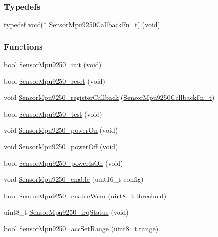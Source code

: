 \subsubsection*{Typedefs}
\begin{DoxyCompactItemize}
\item 
typedef void($\ast$ \hyperlink{_sensor_mpu9250_8h_a46597d1d93c12c2bb2bf0e7fadcf5d3c}{Sensor\+Mpu9250\+Callback\+Fn\+\_\+t}) (void)
\end{DoxyCompactItemize}
\subsubsection*{Functions}
\begin{DoxyCompactItemize}
\item 
bool \hyperlink{_sensor_mpu9250_8h_a70c3dc5a3748b4d87e627a57e00f0212}{Sensor\+Mpu9250\+\_\+init} (void)
\item 
bool \hyperlink{_sensor_mpu9250_8h_aa199e74fac83bfcc797045ce022843d6}{Sensor\+Mpu9250\+\_\+reset} (void)
\item 
void \hyperlink{_sensor_mpu9250_8h_a218bba45842f2a71ce19694c0f73518c}{Sensor\+Mpu9250\+\_\+register\+Callback} (\hyperlink{_sensor_mpu9250_8h_a46597d1d93c12c2bb2bf0e7fadcf5d3c}{Sensor\+Mpu9250\+Callback\+Fn\+\_\+t})
\item 
bool \hyperlink{_sensor_mpu9250_8h_a46bb976672f9a571ff18566d1d3c5a24}{Sensor\+Mpu9250\+\_\+test} (void)
\item 
void \hyperlink{_sensor_mpu9250_8h_ab785d484e3a43d8efa0e3c783caf4613}{Sensor\+Mpu9250\+\_\+power\+On} (void)
\item 
void \hyperlink{_sensor_mpu9250_8h_a3e374299b91f804ffd07db9330796219}{Sensor\+Mpu9250\+\_\+power\+Off} (void)
\item 
bool \hyperlink{_sensor_mpu9250_8h_a39a1fe0e3d26befc2f9032263b6dac1b}{Sensor\+Mpu9250\+\_\+power\+Is\+On} (void)
\item 
void \hyperlink{_sensor_mpu9250_8h_a2c1d07e12e41dfdc993c5783c87cb372}{Sensor\+Mpu9250\+\_\+enable} (uint16\+\_\+t config)
\item 
bool \hyperlink{_sensor_mpu9250_8h_a07cca176e6908a3ce5cad560897a5e93}{Sensor\+Mpu9250\+\_\+enable\+Wom} (uint8\+\_\+t threshold)
\item 
uint8\+\_\+t \hyperlink{_sensor_mpu9250_8h_a5ff6bc06ac2af7d4637951b12b3baed2}{Sensor\+Mpu9250\+\_\+irq\+Status} (void)
\item 
bool \hyperlink{_sensor_mpu9250_8h_ac2f846fe053b4f025d5a60bcd28b5d86}{Sensor\+Mpu9250\+\_\+acc\+Set\+Range} (uint8\+\_\+t range)

\end{DoxyCompactItemize}
